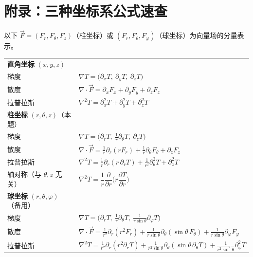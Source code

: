 \documentclass[12pt,a4paper]{ctexart}
\begin{document}
\section*{附录：三种坐标系公式速查}

以下 $\vec{F}=(F_r,F_\theta,F_z)$（柱坐标）或 $(F_r,F_\theta,F_\varphi)$（球坐标）为向量场的分量表示。

\begin{center}
\begin{tabular}{ll}
\toprule
\textbf{直角坐标} $(x,y,z)$ & \\
梯度 & $\nabla T=\big(\partial_x T,\ \partial_y T,\ \partial_z T\big)$ \\
散度 & $\nabla\cdot\vec{F}=\partial_x F_x+\partial_y F_y+\partial_z F_z$ \\
拉普拉斯 & $\nabla^2 T=\partial_x^2 T+\partial_y^2 T+\partial_z^2 T$ \\
\midrule
\textbf{柱坐标} $(r,\theta,z)$（本题） & \\
梯度 & $\nabla T=\big(\partial_r T,\ \tfrac{1}{r}\partial_\theta T,\ \partial_z T\big)$ \\
散度 & $\nabla\cdot\vec{F}=\tfrac{1}{r}\partial_r(rF_r)+\tfrac{1}{r}\partial_\theta F_\theta+\partial_z F_z$ \\
拉普拉斯 & $\nabla^2 T=\tfrac{1}{r}\partial_r(r\,\partial_r T)+\tfrac{1}{r^2}\partial_\theta^2 T+\partial_z^2 T$ \\
轴对称（与 $\theta,z$ 无关） & $\nabla^2 T=\dfrac{1}{r}\dfrac{\partial}{\partial r}\Big(r\dfrac{\partial T}{\partial r}\Big)$ \\
\midrule
\textbf{球坐标} $(r,\theta,\varphi)$（备用） & \\
梯度 & $\nabla T=\big(\partial_r T,\ \tfrac{1}{r}\partial_\theta T,\ \tfrac{1}{r\sin\theta}\partial_\varphi T\big)$ \\
散度 & $\nabla\cdot\vec{F}=\tfrac{1}{r^2}\partial_r(r^2 F_r)+\tfrac{1}{r\sin\theta}\partial_\theta(\sin\theta\,F_\theta)+\tfrac{1}{r\sin\theta}\partial_\varphi F_\varphi$ \\
拉普拉斯 & $\nabla^2 T=\tfrac{1}{r^2}\partial_r(r^2\partial_r T)+\tfrac{1}{r^2\sin\theta}\partial_\theta(\sin\theta\,\partial_\theta T)+\tfrac{1}{r^2\sin^2\theta}\partial_\varphi^2 T$ \\
\bottomrule
\end{tabular}
\end{center}
\end{document}
